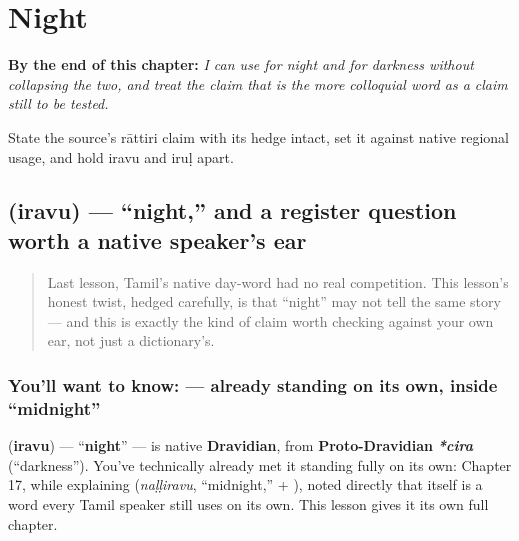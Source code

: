 
\chapter{Night}
\label{ch:ta-night}

\begin{chapteropening}
\textbf{By the end of this chapter:} \emph{I can use  for night and  for darkness without collapsing the two, and treat the claim that  is the more colloquial word as a claim still to be tested.}

State the source's rāttiri claim with its hedge intact, set it against native regional usage, and hold iravu and iruḷ apart.
\end{chapteropening}

\section[\texorpdfstring{\ta{இரவு} (iravu)}{இரவு (iravu)}]{ (iravu) — \textquotedblleft{}night,\textquotedblright{} and a register question worth a native speaker's ear}

\label{lesson:TA-C24-iravu}



\begin{quote}
Last lesson, Tamil's native day-word had no real competition. This lesson's honest twist, hedged carefully, is that \textquotedblleft{}night\textquotedblright{} may not tell the same story — and this is exactly the kind of claim worth checking against your own ear, not just a dictionary's.
\end{quote}

\subsection*{You'll want to know:  — already standing on its own, inside \textquotedblleft{}midnight\textquotedblright{}}
\textbf{} (\textbf{iravu}) — \textquotedblleft{}\textbf{night}\textquotedblright{} — is native \textbf{Dravidian}, from \textbf{Proto-Dravidian} \emph{\textbf{*cira}} (\textquotedblleft{}darkness\textquotedblright{}). You've technically already met it standing fully on its own: Chapter 17, while explaining \textbf{} (\emph{naḷḷiravu}, \textquotedblleft{}midnight,\textquotedblright{}  + ), noted directly that  itself is a word every Tamil speaker still uses on its own. This lesson gives it its own full chapter.

